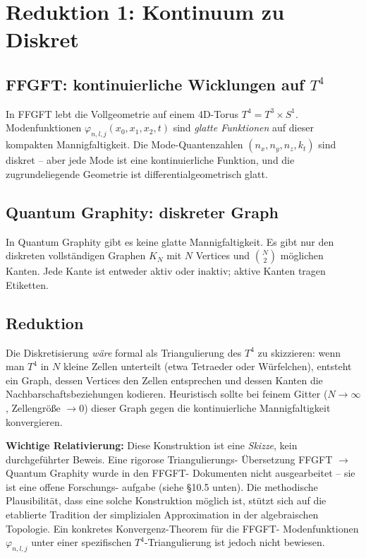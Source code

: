 \section{Reduktion 1: Kontinuum zu Diskret}

\subsection{\texorpdfstring{FFGFT: kontinuierliche Wicklungen auf $T^4$}{FFGFT: kontinuierliche Wicklungen auf T4}}

In FFGFT lebt die Vollgeometrie auf einem 4D-Torus
$T^4 = T^3 \times S^1$. Modenfunktionen $\varphi_{n,l,j}(x_0, x_1, x_2, t)$
sind \emph{glatte Funktionen} auf dieser kompakten Mannigfaltigkeit.
Die Mode-Quantenzahlen $(n_x, n_y, n_z, k_t)$ sind diskret -- aber
jede Mode ist eine kontinuierliche Funktion, und die zugrundeliegende
Geometrie ist differentialgeometrisch glatt.

\subsection{Quantum Graphity: diskreter Graph}

In Quantum Graphity gibt es keine glatte Mannigfaltigkeit. Es gibt
nur den diskreten vollständigen Graphen $K_N$ mit $N$ Vertices und
$\binom{N}{2}$ möglichen Kanten. Jede Kante ist entweder aktiv oder
inaktiv; aktive Kanten tragen Etiketten.

\subsection{Reduktion}

Die Diskretisierung \emph{wäre} formal als Triangulierung des $T^4$
zu skizzieren: wenn man $T^4$ in $N$ kleine Zellen unterteilt (etwa
Tetraeder oder Würfelchen), entsteht ein Graph, dessen Vertices den
Zellen entsprechen und dessen Kanten die Nachbarschaftsbeziehungen
kodieren. Heuristisch sollte bei feinem Gitter ($N \to \infty$,
Zellengröße $\to 0$) dieser Graph gegen die kontinuierliche
Mannigfaltigkeit konvergieren.

\textbf{Wichtige Relativierung:} Diese Konstruktion ist eine
\emph{Skizze}, kein durchgeführter Beweis. Eine rigorose Triangulierungs-
Übersetzung FFGFT $\to$ Quantum Graphity wurde in den FFGFT-
Dokumenten nicht ausgearbeitet -- sie ist eine offene Forschungs-
aufgabe (siehe §10.5 unten). Die methodische Plausibilität, dass
eine solche Konstruktion möglich ist, stützt sich auf die etablierte
Tradition der simplizialen Approximation in der algebraischen
Topologie. Ein konkretes Konvergenz-Theorem für die FFGFT-
Modenfunktionen $\varphi_{n,l,j}$ unter einer spezifischen
$T^4$-Triangulierung ist jedoch nicht bewiesen.

